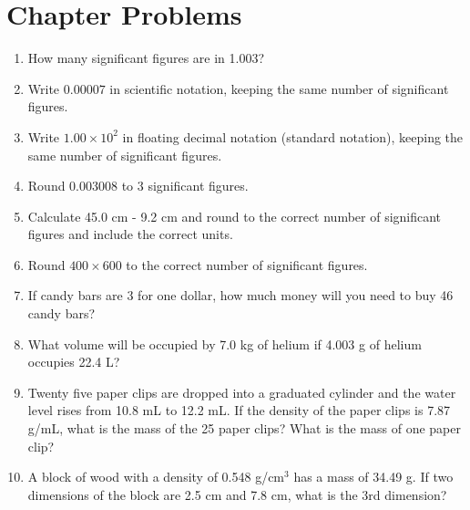 \documentclass[../hchem.tex]{subfiles}
\begin{document}
\section*{Chapter Problems}
\begin{enumerate}
    \item How many significant figures are in 1.003?
    \item Write $0.00007$ in scientific notation, keeping the same number of significant figures.
    \item Write $1.00\times 10^2$ in floating decimal notation (standard notation), keeping the same number of significant figures.
    \item Round 0.003008 to 3 significant figures.
    \item Calculate 45.0 cm - 9.2 cm and round to the correct number of significant figures and include the correct units.
    \item Round $400\times 600$ to the correct number of significant figures.
    \item If candy bars are 3 for one dollar, how much money will you need to buy 46 candy bars?
    \item What volume will be occupied by 7.0 kg of helium if 4.003 g of helium occupies 22.4 L?
    \item Twenty five paper clips are dropped into a graduated cylinder and the water level rises from 10.8 mL to 12.2 mL. If the density of the paper clips is 7.87 g/mL, what is the mass of the 25 paper clips? What is the mass of one paper clip?
    \item A block of wood with a density of 0.548 g/cm$^3$ has a mass of 34.49 g. If two dimensions of the block are 2.5 cm and 7.8 cm, what is the 3rd dimension?
\end{enumerate}
\end{document}
